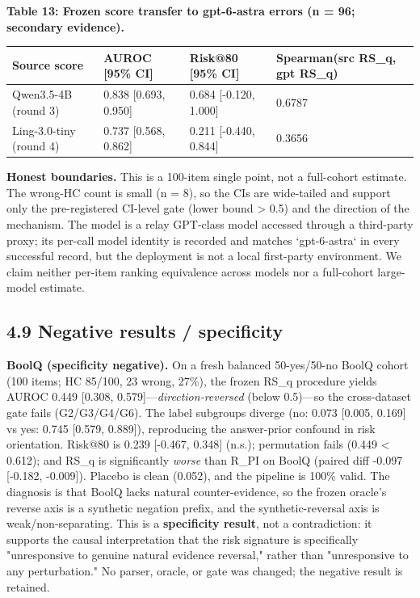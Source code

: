 \documentclass[11pt]{article}
\begin{document}
\textbf{Table 13: Frozen score transfer to gpt-6-astra errors (n = 96; secondary evidence).}

\begin{table}[t]
\centering
\small
\begin{tabular}{llll}
\toprule
Source score & AUROC [95\% CI] & Risk@80 [95\% CI] & Spearman(src RS\_q, gpt RS\_q) \\
\midrule
Qwen3.5-4B (round 3) & 0.838 [0.693, 0.950] & 0.684 [-0.120, 1.000] & 0.6787 \\
Ling-3.0-tiny (round 4) & 0.737 [0.568, 0.862] & 0.211 [-0.440, 0.844] & 0.3656 \\
\bottomrule
\end{tabular}
\end{table}


\textbf{Honest boundaries.} This is a 100-item single point, not a full-cohort estimate. The wrong-HC count is small (n = 8), so the CIs are wide-tailed and support only the pre-registered CI-level gate (lower bound > 0.5) and the direction of the mechanism. The model is a relay GPT-class model accessed through a third-party proxy; its per-call model identity is recorded and matches `gpt-6-astra` in every successful record, but the deployment is not a local first-party environment. We claim neither per-item ranking equivalence across models nor a full-cohort large-model estimate.

\subsection{4.9 Negative results / specificity}

\textbf{BoolQ (specificity negative).} On a fresh balanced 50-yes/50-no BoolQ cohort (100 items; HC 85/100, 23 wrong, 27\%), the frozen RS\_q procedure yields AUROC 0.449 [0.308, 0.579]—\emph{direction-reversed} (below 0.5)—so the cross-dataset gate fails (G2/G3/G4/G6). The label subgroups diverge (no: 0.073 [0.005, 0.169] vs yes: 0.745 [0.579, 0.889]), reproducing the answer-prior confound in risk orientation. Risk@80 is 0.239 [-0.467, 0.348] (n.s.); permutation fails (0.449 < 0.612); and RS\_q is significantly \emph{worse} than R\_PI on BoolQ (paired diff -0.097 [-0.182, -0.009]). Placebo is clean (0.052), and the pipeline is 100\% valid. The diagnosis is that BoolQ lacks natural counter-evidence, so the frozen oracle's reverse axis is a synthetic negation prefix, and the synthetic-reversal axis is weak/non-separating. This is a \textbf{specificity result}, not a contradiction: it supports the causal interpretation that the risk signature is specifically "unresponsive to genuine natural evidence reversal," rather than "unresponsive to any perturbation." No parser, oracle, or gate was changed; the negative result is retained.
\end{document}
